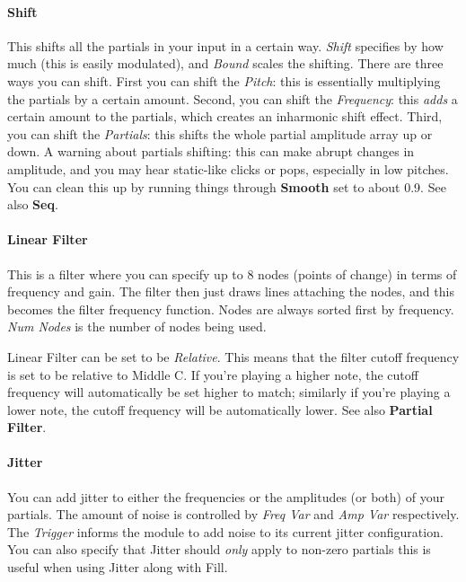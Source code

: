 \documentclass{article}
\begin{document}
\paragraph{Shift} This shifts all the partials in your input in a certain way.  {\it Shift} specifies by how much (this is easily modulated), and {\it Bound} scales the shifting.  There are three ways you can shift.  First you can shift the {\it Pitch}: this is essentially multiplying the partials by a certain amount.  Second, you can shift the {\it Frequency}: this {\it adds} a certain amount to the partials, which creates an inharmonic shift effect.  Third, you can shift the {\it Partials}: this shifts the whole partial amplitude array up or down.  A warning about partials shifting: this can make abrupt changes in amplitude, and you may hear static-like clicks or pops, especially in low pitches.  You can clean this up by running things through {\bf Smooth} set to about 0.9. See also {\bf Seq}.

\paragraph{Linear Filter} This is a filter where you can specify up to 8 nodes (points of change) in terms of frequency and gain.  The filter then just draws lines attaching the nodes, and this becomes the filter frequency function.  Nodes are always sorted first by frequency.  {\it Num Nodes} is the number of nodes being used.

Linear Filter can be set to be {\it Relative}.  This means that the filter cutoff frequency is set to be relative to Middle C.  If you're playing a higher note, the cutoff frequency will automatically be set higher to match; similarly if you're playing a lower note, the cutoff frequency will be automatically lower.  See also {\bf Partial Filter}.

\paragraph{Jitter} You can add jitter to either the frequencies or the amplitudes (or both) of your partials.  The amount of noise is controlled by {\it Freq Var} and {\it Amp Var} respectively.  The {\it Trigger} informs the module to add noise to its current jitter configuration.  You can also specify that Jitter should {\it only} apply to non-zero partials this is useful when using Jitter along with Fill.
\end{document}
